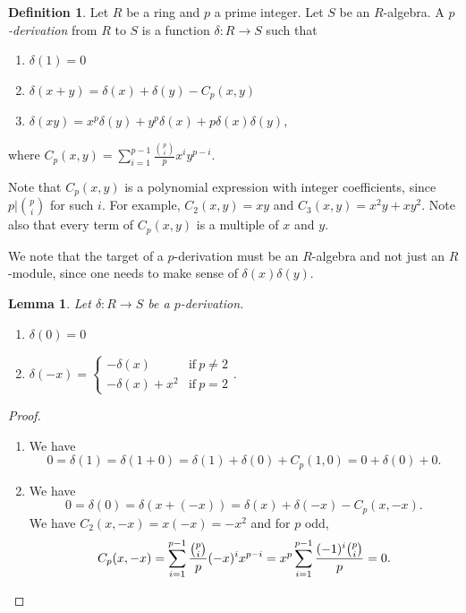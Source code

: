 \documentclass{amsart}[12pt]
\numberwithin{equation}{section}
\theoremstyle{plain} %
\newtheorem{lem}[equation]{Lemma}
\theoremstyle{definition}
\newtheorem{defn}[equation]{Definition}
\theoremstyle{remark}
\begin{document}
\begin{defn} Let $R$ be a ring and $p$ a prime integer. Let $S$ be an $R$-algebra. A \emph{$p$-derivation} from $R$ to $S$ is a function $\delta:R\to S$ such that
\begin{enumerate}
\item $\delta(1)=0$
\item $\delta(x+y) = \delta(x) + \delta(y) - C_p(x,y)$
\item $\delta(xy) = x^p \delta(y) + y^p\delta(x) + p \delta(x)\delta(y)$,
\end{enumerate}
where $C_p(x,y) = \sum_{i=1}^{p-1}\frac{ \binom{p}{i}}{p} x^i y^{p-i}$.
\end{defn}

Note that $C_p(x,y)$ is a polynomial expression with integer coefficients, since $p |  \binom{p}{i}$ for such $i$.
 For example, $C_2(x,y) = xy$ and $C_3(x,y) = x^2 y + xy^2$. Note also that every term of $C_p(x,y)$ is a multiple of $x$ and $y$.
 
We note that the target of a $p$-derivation must be an $R$-algebra and not just an $R$-module, since one needs to make sense of $\delta(x)\delta(y)$.

\begin{lem} Let $\delta:R\to S$ be a $p$-derivation.
\begin{enumerate}
\item $\delta(0)=0$
\item $\delta(-x) = \begin{cases} -\delta(x) & \text{if} \ p\neq 2 \\ -\delta(x) + x^2 & \text{if} \ p= 2  \end{cases}$.
\end{enumerate}
\end{lem}
\begin{proof}
\begin{enumerate}
\item We have
\[ 0 = \delta(1) = \delta(1+0) = \delta(1) + \delta(0) + C_p(1,0) = 0 + \delta(0) + 0.\]
\item We have
 \[ 0 = \delta(0) = \delta( x + (-x) ) = \delta(x) + \delta(-x) - C_p(x,-x).\]
 We have $C_2(x,-x) = x(-x) = -x^2$ and for $p$ odd, 
 \[ C_p(x,-x) = \sum_{i=1}^{p-1} \frac{\binom{p}{i}}{p} (-x)^i x^{p-i} = x^p \sum_{i=1}^{p-1} \frac{(-1)^i \binom{p}{i}}{p}  = 0.\qedhere \]
 \end{enumerate}
 \end{proof}
\end{document}
